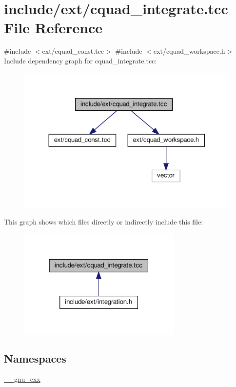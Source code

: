 \hypertarget{cquad__integrate_8tcc}{}\section{include/ext/cquad\+\_\+integrate.tcc File Reference}
\label{cquad__integrate_8tcc}
{\ttfamily \#include $<$ext/cquad\+\_\+const.\+tcc$>$}\newline
{\ttfamily \#include $<$ext/cquad\+\_\+workspace.\+h$>$}\newline
Include dependency graph for cquad\+\_\+integrate.\+tcc\+:
\nopagebreak
\begin{figure}[H]
\begin{center}
\leavevmode
\includegraphics[width=324pt]{cquad__integrate_8tcc__incl}
\end{center}
\end{figure}
This graph shows which files directly or indirectly include this file\+:
\nopagebreak
\begin{figure}[H]
\begin{center}
\leavevmode
\includegraphics[width=232pt]{cquad__integrate_8tcc__dep__incl}
\end{center}
\end{figure}
\subsection*{Namespaces}
\begin{DoxyCompactItemize}
\item 
 \hyperlink{namespace____gnu__cxx}{\+\_\+\+\_\+gnu\+\_\+cxx}
\end{DoxyCompactItemize}
